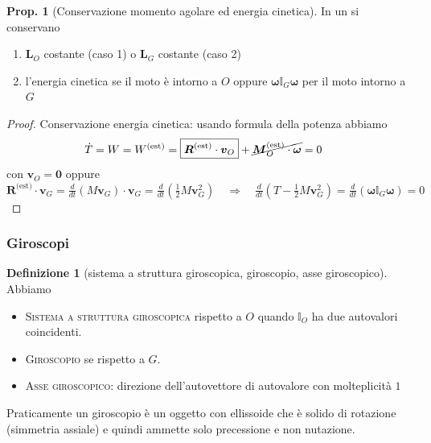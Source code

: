 \documentclass[a4paper,10pt]{article}
\theoremstyle{definition}
\newcommand{\noun}[1]{\textsc{#1}}
\theoremstyle{indentdefinition}
\newtheorem{defn}{Definizione}[section]
\theoremstyle{indenttheorem}
\newtheorem{prop}{Prop.}
\theoremstyle{myremark}
\theoremstyle{indentgeneral}
\newenvironment{myboxed} 
{\noindent\begin{lrbox}{\mybox}\begin{minipage}{\textwidth}}
{\end{minipage}\end{lrbox}\fbox{\usebox{\mybox}}}
\begin{document}
\begin{myboxed}
\begin{prop}[Conservazione momento agolare ed energia cinetica]
    In un  si conservano 
\begin{enumerate}
    \item $\boldsymbol{L}_{O}$ costante (caso 1) o  $\boldsymbol{L}_{G}$ costante (caso 2)
    \item l'energia cinetica se il moto è intorno a $O$ oppure $\boldsymbol{\omega}\mathbb{I}_{G}\boldsymbol{\omega}$
per il moto intorno a $G$
    \end{enumerate}
    \end{prop} 
    \end{myboxed}
\begin{proof} Conservazione energia cinetica: usando formula della potenza abbiamo
\begin{align*}\dot{T} & =W=W^{\text{(est)}}=\boxed{\boldsymbol{R}^{\text{(est)}}\cdot\boldsymbol{v}_{O}}+\cancel{\boldsymbol{M}_{O}^{\text{(est)}}\cdot\boldsymbol{\omega}} =0
\end{align*}
con $\boldsymbol{v}_{O}=\boldsymbol{0}$ oppure $\boldsymbol{R}^{\text{(est)}}\cdot\boldsymbol{v}_{G}=\frac{d}{dt}\left(M\boldsymbol{v}_{G}\right)\cdot\boldsymbol{v}_{G}=\frac{d}{dt}\left(\frac{1}{2}M\boldsymbol{v}_{G}^{2}\right)\quad\Rightarrow\quad\frac{d}{dt}\left(T-\frac{1}{2}M\boldsymbol{v}_{G}^{2}\right)=\frac{d}{dt}\left(\boldsymbol{\omega}\mathbb{I}_{G}\boldsymbol{\omega}\right)=0$
\end{proof}



\subsubsection{Giroscopi}
\begin{defn}[sistema a struttura giroscopica, giroscopio, asse giroscopico] Abbiamo
\begin{itemize}
    \item \noun{Sistema a struttura giroscopica} rispetto a $O$ quando $\mathbb{I}_{O}$
ha due autovalori coincidenti. 
\item \noun{Giroscopio} se rispetto a $G$.
\item \noun{Asse giroscopico}: direzione dell'autovettore di autovalore con molteplicità
$1$
\end{itemize}
Praticamente un giroscopio è un oggetto con ellissoide che è solido di rotazione (simmetria assiale) e quindi ammette solo precessione e non nutazione.

\end{defn}
\end{document}
